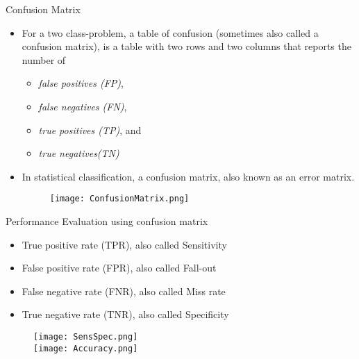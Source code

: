 
\begin{frame}{Confusion Matrix}
\begin{itemize}

\item For a two class-problem, a table of confusion (sometimes also called a confusion matrix), is a table with two rows and two columns that reports the number of
\begin{itemize}
\item  \textit{\color{mycolor2}false positives (FP)}, 
\item \textit{\color{mycolor2} false negatives (FN)}, 
\item \textit{\color{mycolor2}true positives (TP)}, and 
\item \textit{\color{mycolor2}true negatives(TN)}
\end{itemize}

\item In statistical classification, a confusion matrix, also known as an error matrix\nocite{conf2020}.
\begin{figure}
\texttt{[image: ConfusionMatrix.png]}
\end{figure}
\end{itemize}
\end{frame}

\begin{frame}{Performance Evaluation using confusion matrix}
\begin{itemize}
\item True positive rate (TPR), also called Sensitivity
\item False positive rate (FPR), also called Fall-out
\item False negative rate (FNR), also called Miss rate
\item True negative rate (TNR), also called Specificity
\end{itemize}
\begin{figure}
\texttt{[image: SensSpec.png]}\\
\texttt{[image: Accuracy.png]}
\end{figure}
\end{frame}


